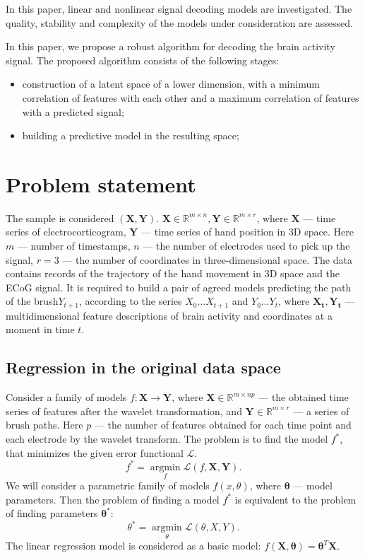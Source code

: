 \documentclass{article}
\newcommand{\argmin}{\mathop{\arg \min}\limits}
\begin{document}
\par
In this paper, linear and nonlinear signal decoding models are investigated. The quality, stability and complexity of the models under consideration are assessed. \par
In this paper, we propose a robust algorithm for decoding the brain activity signal. The proposed algorithm consists of the following stages:
\begin{itemize}
    \item construction of a latent space of a lower dimension, with a minimum correlation of features with each other and a maximum correlation of features with a predicted signal;
    \item building a predictive model in the resulting space;
\end{itemize}

\section{Problem statement}

The sample is considered $(\mathbf{X}, \mathbf{Y}).$ $ \mathbf{X} \in \mathbb{R}^{m \times n},\mathbf{Y} \in \mathbb{R}^{m \times r}$, where $\mathbf{X}$ --- time series of electrocorticogram, $\mathbf{Y}$ --- time series of hand position in 3D space. Here $m$ --- number of timestamps, $n$ --- the number of electrodes used to pick up the signal, $r = 3$ --- the number of coordinates in three-dimensional space. The data contains records of the trajectory of the hand movement in 3D space and the ECoG signal. It is required to build a pair of agreed models predicting the path of the brush$Y_{t+1}$, according to the series $X_0 \dots X_{t+1}$ and $Y_0 \dots Y_t$, where $\mathbf{X_t}, \mathbf{Y_t}$ --- multidimensional feature descriptions of brain activity and coordinates at a moment in time $t$.
\subsection{Regression in the original data space}
Consider a family of models $f: \mathbf{X} \rightarrow \mathbf{Y}$, where $\mathbf{X} \in \mathbb{R}^{m \times np}$ --- the obtained time series of features after the wavelet transformation, and $\mathbf{Y} \in \mathbb{R}^{m \times r}$ --- a series of brush paths. Here $p$ --- the number of features obtained for each time point and each electrode by the wavelet transform. The problem is to find the model $f^*$, that minimizes the given error functional $\mathcal{L}$.
\begin{equation}\label{eq1} 
	f^* = \argmin_f \mathcal{L}(f, \mathbf{X}, \mathbf{Y}).
\end{equation}
We will consider a parametric family of models $f(x, \theta)$, where $\mathbf{\theta}$ --- model parameters. Then the problem of finding a model $f^*$ is equivalent to the problem of finding parameters $\mathbf{\theta^*}$:
\begin{equation}\label{eq2} 
\theta^* = \argmin_{\theta} \mathcal{L}(\theta, X, Y).
\end{equation}
The linear regression model is considered as a basic model:
$f(\mathbf{X}, \mathbf{\theta}) = \mathbf{\theta}^T\mathbf{X}$.
\end{document}
